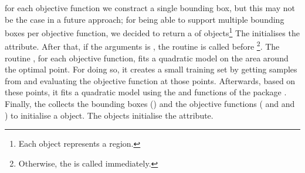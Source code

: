 for each objective function we constract a single bounding box, but
this may not be the case in a future approach; for being able to
support multiple bounding boxes per objective function, we decided to
return a  of 
objects\footnote{Each  object represents a
  region.} The  initialises the
 attribute. After that, if the
 arguments is , the
 routine is called before
\footnote{Otherwise, the
   is called immediately.}. The routine
, for each objective function, fits a quadratic
model on the area around the optimal point. For doing so, it creates a
small training set by getting samples from 
and evaluating the objective function at those points. Afterwards,
based on these points, it fits a quadratic model using the
 and
 functions of the
 package \autocite{scikit-learn}. Finally, the
 collects the bounding boxes
() and the objective functions
( and
 and
) to initialise a
 object. The  objects
initialise the  attribute.


